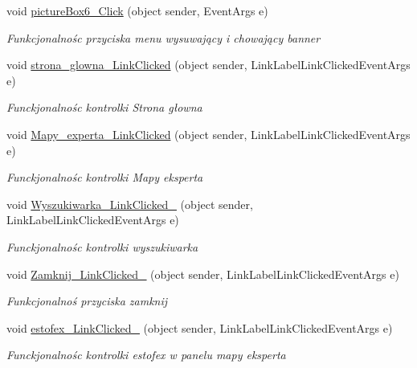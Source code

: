 \begin{DoxyCompactItemize}
void \mbox{\hyperlink{class_pogodynka__w57003_1_1panel__glony_ab0736937098fec29cd5311a389c2b0b4}{picture\+Box6\+\_\+\+Click}} (object sender, Event\+Args e)
\begin{DoxyCompactList}\small\item\em Funkcjonalnośc przyciska menu wysuwający i chowający banner \end{DoxyCompactList}\item 
void \mbox{\hyperlink{class_pogodynka__w57003_1_1panel__glony_a7947ac67ced4aa22c0f52aed6ad3b3f3}{strona\+\_\+glowna\+\_\+\+Link\+Clicked}} (object sender, Link\+Label\+Link\+Clicked\+Event\+Args e)
\begin{DoxyCompactList}\small\item\em Funckjonalnośc kontrolki Strona głowna \end{DoxyCompactList}\item 
void \mbox{\hyperlink{class_pogodynka__w57003_1_1panel__glony_ac5516e612d6350c23e9caaa4682dcfa7}{Mapy\+\_\+experta\+\_\+\+Link\+Clicked}} (object sender, Link\+Label\+Link\+Clicked\+Event\+Args e)
\begin{DoxyCompactList}\small\item\em Funckjonalnośc kontrolki Mapy eksperta \end{DoxyCompactList}\item 
void \mbox{\hyperlink{class_pogodynka__w57003_1_1panel__glony_ac3892cf16a3589e5578defe1786710e0}{Wyszukiwarka\+\_\+\+Link\+Clicked\+\_}} (object sender, Link\+Label\+Link\+Clicked\+Event\+Args e)
\begin{DoxyCompactList}\small\item\em Funckjonalnośc kontrolki wyszukiwarka \end{DoxyCompactList}\item 
void \mbox{\hyperlink{class_pogodynka__w57003_1_1panel__glony_a8d32fcf8f9a2d131dc124427170bc84c}{Zamknij\+\_\+\+Link\+Clicked\+\_}} (object sender, Link\+Label\+Link\+Clicked\+Event\+Args e)
\begin{DoxyCompactList}\small\item\em Funkcjonalnoś przyciska zamknij \end{DoxyCompactList}\item 
void \mbox{\hyperlink{class_pogodynka__w57003_1_1panel__glony_aa677678689be30d9ddab7cc4de694bf0}{estofex\+\_\+\+Link\+Clicked\+\_}} (object sender, Link\+Label\+Link\+Clicked\+Event\+Args e)
\begin{DoxyCompactList}\small\item\em Funckjonalnośc kontrolki estofex w panelu mapy eksperta \end{DoxyCompactList}\item 

\end{DoxyCompactItemize}
